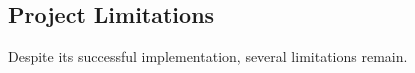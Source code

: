 \subsection{Project Limitations}

    Despite its successful implementation, several limitations remain.

    